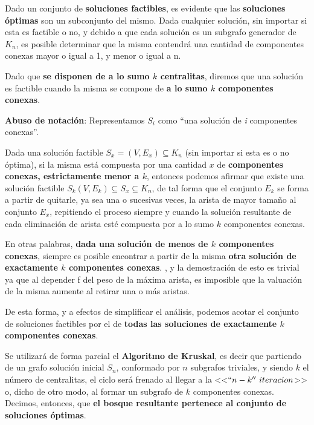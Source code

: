 \documentclass[11pt, a4paper, twoside]{article}
\begin{document}

Dado un conjunto de \textbf{soluciones factibles}, es evidente que las \textbf{soluciones óptimas}
son un subconjunto del mismo. Dada cualquier solución, sin importar si esta es factible o no, y
debido a que cada solución es un subgrafo generador de $K_{n}$, es posible determinar que la misma
contendrá una cantidad de componentes conexas mayor o igual a 1, y menor o igual a n.

Dado que \textbf{se disponen de a lo sumo $k$ centralitas}, diremos que una solución es factible
cuando la misma se compone de \textbf{a lo sumo $k$ componentes conexas}.

\textbf{Abuso de notación}: Representamos $S_{i}$ como ``una solución de \emph{i} componentes conexas''.

Dada una solución factible $S_{x} = (V, E_{x}) \subseteq K_{n}$ (sin importar si esta es o no
óptima), si la misma está compuesta por una cantidad $x$ de \textbf{componentes conexas,
estrictamente menor a $k$}, entonces podemos afirmar que existe una solución factible $S_{k} (V,
E_{k}) \subseteq S_{x} \subseteq K_{n}$, de tal forma que el conjunto $E_{k}$ se forma a partir de
quitarle, ya sea una o sucesivas veces, la arista de mayor tamaño al conjunto $E_{x}$, repitiendo el
proceso siempre y cuando la solución resultante de cada eliminación de arista esté compuesta por a
lo sumo $k$ componentes conexas.

En otras palabras, \textbf{dada una solución de menos de $k$ componentes conexas}, siempre es
posible encontrar a partir de la misma \textbf{otra solución de exactamente $k$ componentes
conexas}. , y la demostración de esto
es trivial ya que al depender f del peso de la máxima arista, es imposible que la valuación de la
misma aumente al retirar una o más aristas.

De esta forma, y a efectos de simplificar el análisis, podemos acotar el conjunto de soluciones
factibles por el de \textbf{todas las soluciones de exactamente $k$ componentes conexas}.



Se utilizará de forma parcial el \textbf{Algoritmo de Kruskal}, es decir que partiendo de un grafo solución
inicial $S_{n}$, conformado por $n$ subgrafos triviales, y siendo $k$ el número de centralitas, el
ciclo será frenado al llegar a la <<$``n-k''~iteracion$>> o, dicho de otro modo, al formar un
subgrafo de $k$ componentes conexas. Decimos, entonces, que \textbf{el bosque resultante pertenece al
conjunto de soluciones óptimas}.
\end{document}
